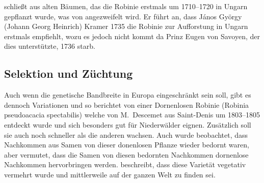 \documentclass[twocolumn]{scrartcl}
\begin{document}
\citet[S.~3]{vadas1911robinie} schließt aus alten Bäumen, das
die Robinie erstmals um 1710--1720 in Ungarn gepflanzt wurde, was von
\citet[S.~179]{ernyey1926robinie} angezweifelt wird. Er führt an, dass
János György (Johann Georg Heinrich) Kramer 1735 die Robinie zur
Aufforstung in Ungarn erstmals empfiehlt, wozu es jedoch nicht kommt da
Prinz Eugen von Savoyen, der dies unterstützte, 1736 starb.

\subsection{Selektion und Züchtung}

Auch wenn die genetische Bandbreite in Europa eingeschränkt sein soll, gibt es
dennoch Variationen und so berichtet \citet[S.~259--260]{Michaux1813arbres} von
einer Dornenlosen Robinie (Robinia pseudoacacia spectabilis) welche von
M.~Descemet aus Saint-Denis um 1803--1805 entdeckt wurde und sich besonders gut
für Niederwälder eignen. Zusätzlich soll sie auch noch schneller als die anderen
wachsen. Auch wurde beobachtet, dass Nachkommen aus Samen von dieser donenlosen
Pflanze wieder bedornt waren, aber \citet{Michaux1813arbres} vermutet, dass die
Samen von diesen bedornten Nachkommen dornenlose Nachkommen hervorbringen
werden. \citet[S.~173]{quatrefages1861robinie} beschreibt, dass diese Varietät
vegetativ vermehrt wurde und mittlerweile auf der ganzen Welt zu finden sei.
\end{document}
